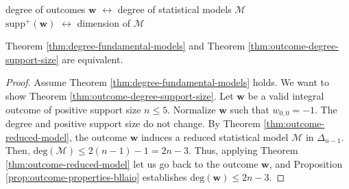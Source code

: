 \begin{center}
    degree of outcomes \( \mathbf{w} \) \( \longleftrightarrow \) degree of statistical models \( \mathcal{M} \) \\
    \( \mathrm{supp}^+(\mathbf w) \) \( \longleftrightarrow \) dimension of \( \mathcal{M} \)
\end{center}

\begin{proposition}\label{prop:equivalence-degree-support-size}
    Theorem \ref{thm:degree-fundamental-models} and Theorem \ref{thm:outcome-degree-support-size} are equivalent.
\end{proposition}

\begin{proof}
    Assume Theorem \ref{thm:degree-fundamental-models} holds. We want to show Theorem \ref{thm:outcome-degree-support-size}. Let \( \mathbf{w} \) be a valid integral outcome of positive support size \( n \leq 5 \). Normalize \( \mathbf{w} \) such that \( w_{0,0} = -1 \). The degree and positive support size do not change. By Theorem \ref{thm:outcome-reduced-model}, the outcome \( \mathbf{w} \) induces a reduced statistical model \( \mathcal{M} \) in \( \Delta_{n-1} \). Then, \( \mathrm{deg}(\mathcal{M}) \leq 2(n-1) -1 = 2n - 3\). Thus, applying Theorem \ref{thm:outcome-reduced-model} let us go back to the outcome \( \mathbf w \), and Proposition \ref{prop:outcome-properties-bllaio} establishes \( \mathrm{deg}(\mathbf w) \leq 2n - 3 \).


\end{proof}

